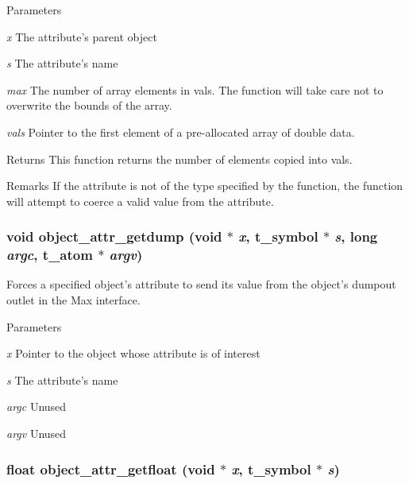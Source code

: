 \begin{DoxyParams}{Parameters}
\item[{\em x}]The attribute's parent object \item[{\em s}]The attribute's name \item[{\em max}]The number of array elements in {\ttfamily vals}. The function will take care not to overwrite the bounds of the array. \item[{\em vals}]Pointer to the first element of a pre-\/allocated array of double data.\end{DoxyParams}
\begin{DoxyReturn}{Returns}
This function returns the number of elements copied into {\ttfamily vals}.
\end{DoxyReturn}
\begin{DoxyRemark}{Remarks}
If the attribute is not of the type specified by the function, the function will attempt to coerce a valid value from the attribute. 
\end{DoxyRemark}
\hypertarget{group__attr_gadf2a0e143dd9a5426516af02283f2c97}{
\subsubsection[{object\_\-attr\_\-getdump}]{\setlength{\rightskip}{0pt plus 5cm}void object\_\-attr\_\-getdump (void $\ast$ {\em x}, \/  {\bf t\_\-symbol} $\ast$ {\em s}, \/  long {\em argc}, \/  {\bf t\_\-atom} $\ast$ {\em argv})}}
\label{group__attr_gadf2a0e143dd9a5426516af02283f2c97}


Forces a specified object's attribute to send its value from the object's dumpout outlet in the Max interface. 
\begin{DoxyParams}{Parameters}
\item[{\em x}]Pointer to the object whose attribute is of interest \item[{\em s}]The attribute's name \item[{\em argc}]Unused \item[{\em argv}]Unused \end{DoxyParams}
\hypertarget{group__attr_ga8a00ca794e7b08f5e73a158503120de9}{
\subsubsection[{object\_\-attr\_\-getfloat}]{\setlength{\rightskip}{0pt plus 5cm}float object\_\-attr\_\-getfloat (void $\ast$ {\em x}, \/  {\bf t\_\-symbol} $\ast$ {\em s})}}
\label{group__attr_ga8a00ca794e7b08f5e73a158503120de9}



